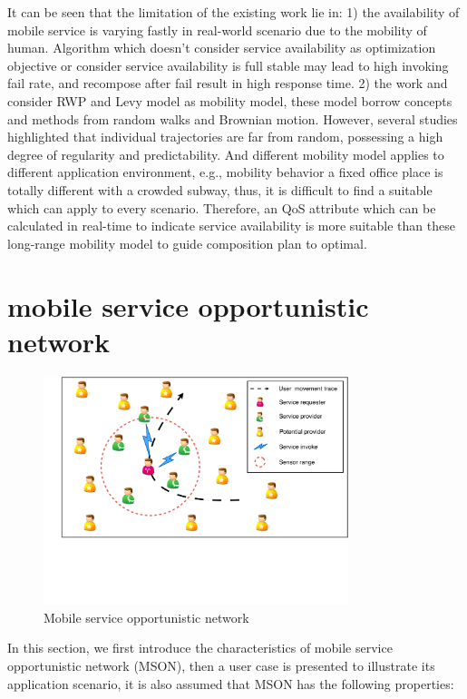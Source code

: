 \documentclass[10pt,journal,compsoc]{IEEEtran}
\begin{document}
It can be seen that the limitation of the existing work lie in: 1) the availability of mobile service is varying fastly in real-world scenario due to the mobility of human. Algorithm which doesn't consider service availability as optimization objective or consider service availability is full stable may lead to high invoking fail rate, and recompose after fail result in high response time. 2) the work \cite{sadiq2015service} and \cite{Deng2017} consider RWP and  Levy model as mobility model, these model borrow concepts and methods from random walks and Brownian motion. However, several studies highlighted that individual trajectories are far from random, possessing a high degree of regularity and predictability. And different mobility model applies to different application environment, e.g., mobility behavior a fixed office place is totally different with a crowded subway, thus, it is difficult to find a suitable which can apply to every scenario. Therefore, an QoS attribute which can be calculated in real-time to indicate service availability is more suitable than these long-range mobility model to guide composition plan to optimal.


\section{mobile service opportunistic network}

\begin{figure}[!t]
\centering
\includegraphics[width=3.5in]{./img/pic2.pdf}
\caption{Mobile service opportunistic network}
\label{fig_mson}
\end{figure}

In this section, we first introduce the characteristics of mobile service opportunistic network (MSON), then a user case is presented to illustrate its application scenario, it is also assumed that MSON has the following properties:
\end{document}
